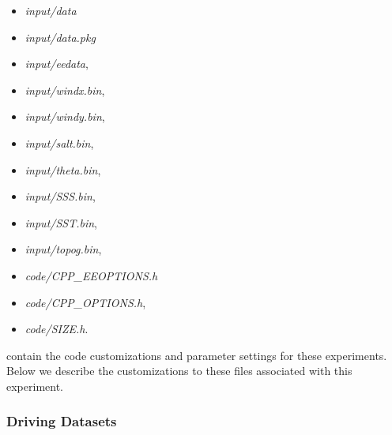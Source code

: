\begin{itemize}
\item {\it input/data}
\item {\it input/data.pkg}
\item {\it input/eedata},
\item {\it input/windx.bin},
\item {\it input/windy.bin},
\item {\it input/salt.bin},
\item {\it input/theta.bin},
\item {\it input/SSS.bin},
\item {\it input/SST.bin},
\item {\it input/topog.bin},
\item {\it code/CPP\_EEOPTIONS.h}
\item {\it code/CPP\_OPTIONS.h},
\item {\it code/SIZE.h}. 
\end{itemize}
contain the code customizations and parameter settings for these
experiments. Below we describe the customizations
to these files associated with this experiment.

\subsubsection{Driving Datasets}
\label{www:tutorials}

